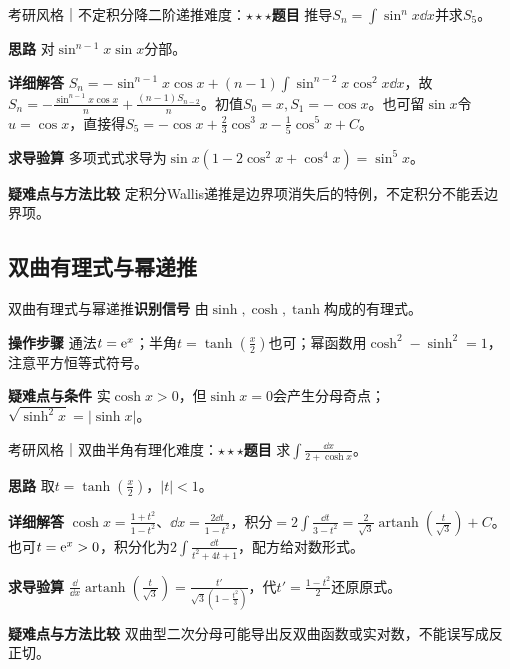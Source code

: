 \begin{example}{考研风格｜不定积分降二阶递推}{难度：$\star\star\star$}\label{ic:ex:indefinite_classical_complete:sinrec}\textbf{题目} 推导$S_n=\int\sin^nx\dd x$并求$S_5$。\par \textbf{思路} 对$\sin^{n-1}x\sin x$分部。\par \textbf{详细解答} $S_n=-\sin^{n-1}x\cos x+(n-1)\int\sin^{n-2}x\cos^2x\dd x$，故$S_n=-\frac{\sin^{n-1}x\cos x}{n}+\frac{(n-1)S_{n-2}}{n}$。初值$S_0=x,S_1=-\cos x$。也可留$\sin x$令$u=\cos x$，直接得$S_5=-\cos x+\frac23\cos^3x-\frac15\cos^5x+C$。\par \textbf{求导验算} 多项式式求导为$\sin x(1-2\cos^2x+\cos^4x)=\sin^5x$。\par \textbf{疑难点与方法比较} 定积分Wallis递推是边界项消失后的特例，不定积分不能丢边界项。\end{example}

\subsection{双曲有理式与幂递推}\label{ic:indefinite_classical_complete:hyperbolic}\begin{method}{双曲有理式与幂递推}\textbf{识别信号} 由$\sinh,\cosh,\tanh$构成的有理式。\par \textbf{操作步骤} 通法$t=\mathrm{e}^x$；半角$t=\tanh(\frac{x}{2})$也可；幂函数用$\cosh^2-\sinh^2=1$，注意平方恒等式符号。\par \textbf{疑难点与条件} 实$\cosh x>0$，但$\sinh x=0$会产生分母奇点；$\sqrt{\sinh^2x}=|\sinh x|$。\end{method}

\begin{example}{考研风格｜双曲半角有理化}{难度：$\star\star\star$}\label{ic:ex:indefinite_classical_complete:hyperbolicrat}\textbf{题目} 求$\int\frac{\dd x}{2+\cosh x}$。\par \textbf{思路} 取$t=\tanh(\frac{x}{2})$，$|t|<1$。\par \textbf{详细解答} $\cosh x=\frac{1+t^2}{1-t^2}$、$\dd x=\frac{2\dd t}{1-t^2}$，积分$=2\int\frac{\dd t}{3-t^2}=\frac2{\sqrt3}\operatorname{artanh}(\frac{t}{\sqrt3})+C$。也可$t=\mathrm{e}^x>0$，积分化为$2\int\frac{\dd t}{t^2+4t+1}$，配方给对数形式。\par \textbf{求导验算} $\frac{\dd}{\dd x}\operatorname{artanh}(\frac{t}{\sqrt3})=\frac{t'}{\sqrt3(1-\frac{t^2}{3})}$，代$t'=\frac{1-t^2}{2}$还原原式。\par \textbf{疑难点与方法比较} 双曲型二次分母可能导出反双曲函数或实对数，不能误写成反正切。\end{example}


